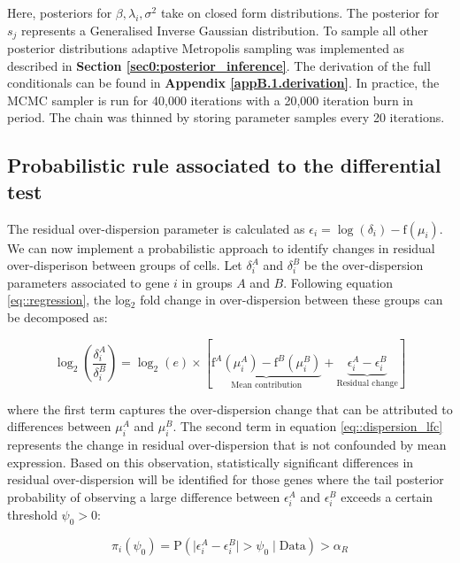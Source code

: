 Here, posteriors for $\beta, \lambda_i, \sigma^2$ take on closed form distributions. The posterior for $s_j$ represents a Generalised Inverse Gaussian distribution. To sample all other posterior distributions adaptive Metropolis sampling was implemented as described in \textbf{Section \ref{sec0:posterior_inference}}. The derivation of the full conditionals can be found in \textbf{Appendix  \ref{appB.1.derivation}}. In practice, the MCMC sampler is run for 40,000 iterations with a 20,000 iteration burn in period. The chain was thinned by storing parameter samples every 20 iterations.

\newpage

\subsection{Probabilistic rule associated to the differential test} \label{sec:differentialtest}

The residual over-dispersion parameter is calculated as $\epsilon_i=\log(\delta_i)-\text{f}(\mu_i)$. We can now implement a probabilistic approach to identify changes in residual over-disperison between groups of cells. Let $\delta_i^A$ and $\delta_i^B$ be the over-dispersion parameters associated to gene $i$ in groups $A$ and $B$. Following equation \eqref{eq::regression}, the log$_2$ fold change in over-dispersion between these groups can be decomposed as: 

\begin{equation} \label{eq::dispersion_lfc}
\log_2 \left( \frac{\delta_i^A}{\delta_i^B}\right) = \log_2(e) \times \left[\underbrace{\text{f}^A(\mu_i^A) - \text{f}^B(\mu_i^B) }_{\text{Mean contribution}} + \underbrace{\epsilon_i^A - \epsilon_i^B}_{\text{Residual change}} \right]
\end{equation} 

where the first term captures the over-dispersion change that can be attributed to differences between $\mu_i^A$ and $\mu_i^B$. The second term in equation \eqref{eq::dispersion_lfc} represents the change in residual over-dispersion that is not confounded by mean expression. Based on this observation, statistically significant differences in residual over-dispersion will be identified for those genes where the tail posterior probability of observing a large difference between $\epsilon_i^A$ and $\epsilon_i^B$ exceeds a certain threshold $\psi_0 > 0$:

\begin{equation} \label{eq::decision_rule}
\pi_i(\psi_0)=\text{P}(\mid\epsilon_i^{A}-\epsilon_i^{B}\mid >\psi_0 \mid \text{Data} ) >\alpha_R
\end{equation}
 
